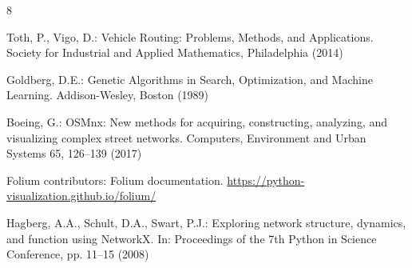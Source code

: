 \documentclass[runningheads]{llncs}
\begin{document}
%
%
% 
% 
%
\begin{thebibliography}{8}

Toth, P., Vigo, D.: Vehicle Routing: Problems, Methods, and Applications.
Society for Industrial and Applied Mathematics, Philadelphia (2014)

Goldberg, D.E.: Genetic Algorithms in Search, Optimization, and Machine
Learning. Addison-Wesley, Boston (1989)

Boeing, G.: OSMnx: New methods for acquiring, constructing, analyzing, and
visualizing complex street networks. Computers, Environment and Urban Systems
65, 126--139 (2017)

Folium contributors: Folium documentation. \url{https://python-visualization.github.io/folium/}

Hagberg, A.A., Schult, D.A., Swart, P.J.: Exploring network structure,
dynamics, and function using NetworkX. In: Proceedings of the 7th Python in
Science Conference, pp. 11--15 (2008)

\end{thebibliography}
\end{document}
